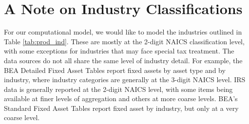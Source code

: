 \documentclass[article,11pt,letterpaper,fleqn]{article}
\theoremstyle{definition}
\numberwithin{equation}{section}
\begin{document}
\section{A Note on Industry Classifications}

For our computational model, we would like to model the industries outlined in Table \ref{tab:prod_ind}. These are mostly at the 2-digit NAICS classification level, with some exceptions for industries that may face special tax treatment.  The data sources do not all share the same level of industry detail.  For example, the BEA Detailed Fixed Asset Tables report fixed assets by asset type and by industry, where industry categories are generally at the 3-digit NAICS level.  IRS data is generally reported at the 2-digit NAICS level, with some items being available at finer levels of aggregation and others at more coarse levels.  BEA's Standard Fixed Asset Tables report fixed asset by industry, but only at a very coarse level.  
\end{document}
